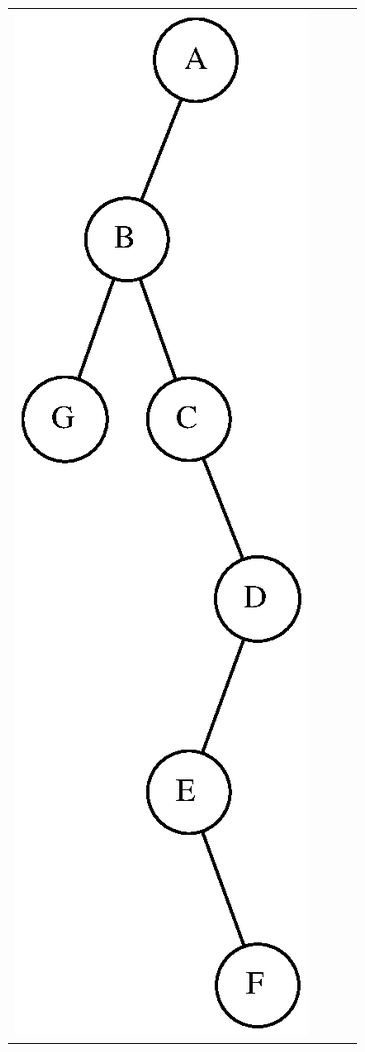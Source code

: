 \documentclass[aspectratio=169]{beamer}
\begin{document}
\begin{frame}[fragile]
\begin{enumerate}
\begin{tabular}{llll}
\includegraphics[height=0.5\paperheight]{imagens/arvore_binaria04.eps} &

\end{tabular}
\end{enumerate}
\end{frame}
\end{document}
